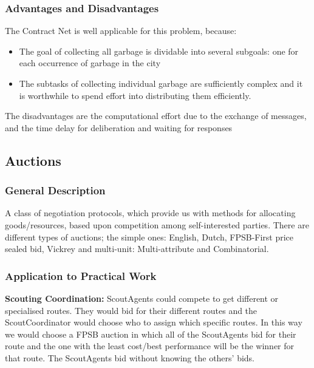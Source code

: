 \subsubsection{Advantages and Disadvantages}

The Contract Net is well applicable for this problem, because:

\begin{itemize}
	\item The goal of collecting all garbage is dividable into several subgoals: one for each occurrence of garbage in the city
	\item The subtasks of collecting individual garbage are sufficiently complex and it is worthwhile to spend effort into distributing them efficiently. 
\end{itemize}

The disadvantages are the computational effort due to the exchange of messages, and the time delay for deliberation and waiting for responses 



\subsection{Auctions}

\subsubsection{General Description}

A class of negotiation protocols, which provide us with methods for allocating goods/resources, based upon competition among self-interested parties.
There are different types of auctions; the simple ones: English, Dutch, FPSB-First price sealed bid, Vickrey and multi-unit: Multi-attribute and  Combinatorial. 

\subsubsection{Application to Practical Work}

\textbf{Scouting Coordination:} ScoutAgents could compete to get different or specialised routes. They would bid for their different routes and the ScoutCoordinator would choose who to assign which specific routes. In this way we would choose a FPSB auction in which all of the ScoutAgents bid for their route and the one with the least cost/best performance will be the winner for that route. The ScoutAgents bid without knowing the others' bids.

